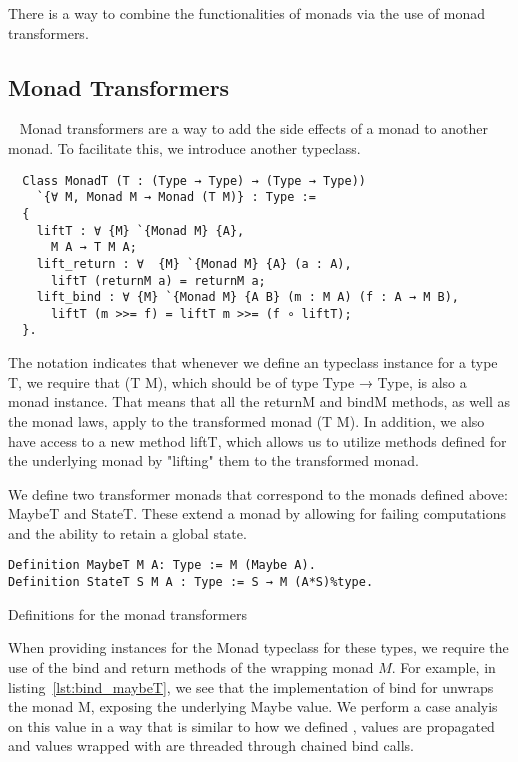 There is a way to combine the functionalities of monads via the use of monad
transformers. 

\subsection{Monad Transformers}~\label{sec:monad_transformers}
Monad transformers\cite{liang1995monad} are a way to add the side effects of a
monad to another monad. To facilitate this, we introduce another typeclass.

\begin{listing}
\begin{verbatim}
  Class MonadT (T : (Type → Type) → (Type → Type)) 
    `{∀ M, Monad M → Monad (T M)} : Type :=
  {
    liftT : ∀ {M} `{Monad M} {A}, 
      M A → T M A;
    lift_return : ∀  {M} `{Monad M} {A} (a : A), 
      liftT (returnM a) = returnM a;
    lift_bind : ∀ {M} `{Monad M} {A B} (m : M A) (f : A → M B),
      liftT (m >>= f) = liftT m >>= (f ∘ liftT);
  }.
\end{verbatim}
\end{listing}

The notation  indicates that whenever we define an
typeclass instance for a type T, we require that (T M), which should be of type
Type → Type, is also a monad instance. That means that all the returnM and
bindM methods, as well as the monad laws, apply to the transformed monad (T M).
In addition, we also have access to a new method liftT, which allows us to
utilize methods defined for the underlying monad by "lifting" them to the
transformed monad. 

We define two transformer monads that correspond to the monads defined above:
MaybeT and StateT. These extend a monad by allowing for failing computations
and the ability to retain a global state. 

\begin{listing}
\begin{verbatim}
Definition MaybeT M A: Type := M (Maybe A).
Definition StateT S M A : Type := S → M (A*S)%type.
\end{verbatim}
\caption{Definitions for the monad transformers}
\end{listing}

When providing instances for the Monad typeclass for these types, we require
the use of the bind and return methods of the wrapping monad $M$.
For example, in listing~\ref{lst:bind_maybeT}, we see that the implementation 
of  bind for 
unwraps the monad M, exposing the underlying Maybe value. We perform a case
analyis on this value in a way that is similar to how we defined
,
 values are propagated and values wrapped with  are 
threaded through chained bind calls.

